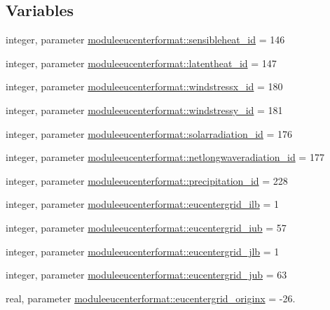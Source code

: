 \subsection*{Variables}
\begin{DoxyCompactItemize}
\item 
integer, parameter \mbox{\hyperlink{namespacemoduleeucenterformat_a438f4f3e96330053b7da9b6589cdb1b1}{moduleeucenterformat\+::sensibleheat\+\_\+id}} = 146
\item 
integer, parameter \mbox{\hyperlink{namespacemoduleeucenterformat_a8c61f64f48e54138b77142afd78c1dae}{moduleeucenterformat\+::latentheat\+\_\+id}} = 147
\item 
integer, parameter \mbox{\hyperlink{namespacemoduleeucenterformat_a156281fa4c18e658c6e7fc64f2ca840f}{moduleeucenterformat\+::windstressx\+\_\+id}} = 180
\item 
integer, parameter \mbox{\hyperlink{namespacemoduleeucenterformat_a40a3439722e2c27c4b9da1d86092f2df}{moduleeucenterformat\+::windstressy\+\_\+id}} = 181
\item 
integer, parameter \mbox{\hyperlink{namespacemoduleeucenterformat_ad5a7d7a3c2b26c8a8ae22d72818f99f3}{moduleeucenterformat\+::solarradiation\+\_\+id}} = 176
\item 
integer, parameter \mbox{\hyperlink{namespacemoduleeucenterformat_a9eaba21c58411b29c7b8cbfe51d9cefd}{moduleeucenterformat\+::netlongwaveradiation\+\_\+id}} = 177
\item 
integer, parameter \mbox{\hyperlink{namespacemoduleeucenterformat_a5814ea5a0ff165440641669008777f19}{moduleeucenterformat\+::precipitation\+\_\+id}} = 228
\item 
integer, parameter \mbox{\hyperlink{namespacemoduleeucenterformat_a36fad08856d94964af3ea808f3fdebf4}{moduleeucenterformat\+::eucentergrid\+\_\+ilb}} = 1
\item 
integer, parameter \mbox{\hyperlink{namespacemoduleeucenterformat_a88ae7517d7855a19bb1fed4e1e708767}{moduleeucenterformat\+::eucentergrid\+\_\+iub}} = 57
\item 
integer, parameter \mbox{\hyperlink{namespacemoduleeucenterformat_a9b0881ac83f9cca422a542537aaeb53a}{moduleeucenterformat\+::eucentergrid\+\_\+jlb}} = 1
\item 
integer, parameter \mbox{\hyperlink{namespacemoduleeucenterformat_aff046230f1fcd04f274110f84e333c6f}{moduleeucenterformat\+::eucentergrid\+\_\+jub}} = 63
\item 
real, parameter \mbox{\hyperlink{namespacemoduleeucenterformat_abd879d2be92c03d9212bb22be0121c3e}{moduleeucenterformat\+::eucentergrid\+\_\+originx}} = -\/26.

\end{DoxyCompactItemize}
